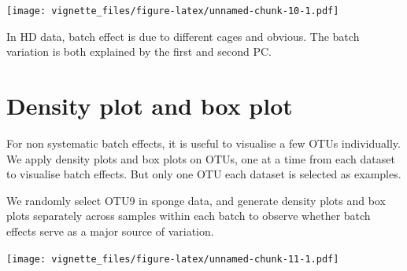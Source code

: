 \documentclass[]{book}
\newenvironment{Shaded}{\begin{snugshade}}{\end{snugshade}}
\newcommand{\KeywordTok}[1]{\textcolor[rgb]{0.13,0.29,0.53}{\textbf{#1}}}
\newcommand{\DataTypeTok}[1]{\textcolor[rgb]{0.13,0.29,0.53}{#1}}
\newcommand{\DecValTok}[1]{\textcolor[rgb]{0.00,0.00,0.81}{#1}}
\newcommand{\StringTok}[1]{\textcolor[rgb]{0.31,0.60,0.02}{#1}}
\newcommand{\CommentTok}[1]{\textcolor[rgb]{0.56,0.35,0.01}{\textit{#1}}}
\newcommand{\OperatorTok}[1]{\textcolor[rgb]{0.81,0.36,0.00}{\textbf{#1}}}
\newcommand{\NormalTok}[1]{#1}
\begin{document}
\texttt{[image: vignette\_files/figure-latex/unnamed-chunk-10-1.pdf]}

In HD data, batch effect is due to different cages and obvious. The
batch variation is both explained by the first and second PC.

\section{Density plot and box plot}\label{density-plot-and-box-plot}

For non systematic batch effects, it is useful to visualise a few OTUs
individually. We apply density plots and box plots on OTUs, one at a
time from each dataset to visualise batch effects. But only one OTU each
dataset is selected as examples.

We randomly select OTU9 in sponge data, and generate density plots and
box plots separately across samples within each batch to observe whether
batch effects serve as a major source of variation.

\begin{Shaded}
\end{Shaded}

\texttt{[image: vignette\_files/figure-latex/unnamed-chunk-11-1.pdf]}
\end{document}
